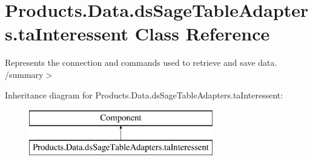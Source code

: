 \hypertarget{class_products_1_1_data_1_1ds_sage_table_adapters_1_1ta_interessent}{}\section{Products.\+Data.\+ds\+Sage\+Table\+Adapters.\+ta\+Interessent Class Reference}
\label{class_products_1_1_data_1_1ds_sage_table_adapters_1_1ta_interessent}


Represents the connection and commands used to retrieve and save data. /summary$>$  


Inheritance diagram for Products.\+Data.\+ds\+Sage\+Table\+Adapters.\+ta\+Interessent\+:\begin{figure}[H]
\begin{center}
\leavevmode
\includegraphics[height=2.000000cm]{class_products_1_1_data_1_1ds_sage_table_adapters_1_1ta_interessent}
\end{center}
\end{figure}
